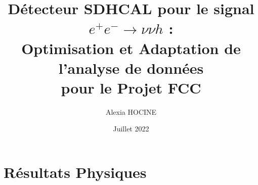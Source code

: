 \documentclass[10pt,a4paper]{report}
\author{Alexia \textsc{HOCINE}}
\title{
	Détecteur SDHCAL pour le signal  $ e^{+} e^{-} \longrightarrow \nu \nu h $ :\\
	Optimisation et Adaptation de l'analyse de données\\pour le Projet FCC 
}
\date{Juillet 2022}
\begin{document}


\tableofcontents







\chapter{Résultats Physiques}









\begin{appendix}

%

%


\end{appendix}




%





\end{document}
